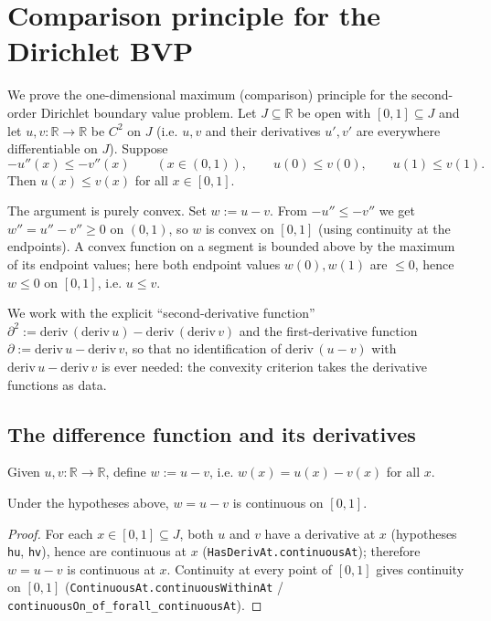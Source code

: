 


\section{Comparison principle for the Dirichlet BVP}

We prove the one-dimensional maximum (comparison) principle for the second-order
Dirichlet boundary value problem. Let $J \subseteq \mathbb{R}$ be open with
$[0,1] \subseteq J$ and let $u, v : \mathbb{R} \to \mathbb{R}$ be $C^2$ on $J$
(i.e. $u, v$ and their derivatives $u', v'$ are everywhere differentiable on $J$).
Suppose
\[
    -u''(x) \le -v''(x) \qquad (x \in (0,1)),
    \qquad u(0) \le v(0), \qquad u(1) \le v(1).
\]
Then $u(x) \le v(x)$ for all $x \in [0,1]$.

The argument is purely convex. Set $w := u - v$. From $-u'' \le -v''$ we get
$w'' = u'' - v'' \ge 0$ on $(0,1)$, so $w$ is convex on $[0,1]$ (using
continuity at the endpoints). A convex function on a segment is bounded above by
the maximum of its endpoint values; here both endpoint values $w(0), w(1)$ are
$\le 0$, hence $w \le 0$ on $[0,1]$, i.e. $u \le v$.

We work with the explicit ``second-derivative function'' $\partial^2 :=
\mathrm{deriv}\,(\mathrm{deriv}\,u) - \mathrm{deriv}\,(\mathrm{deriv}\,v)$ and the
first-derivative function $\partial := \mathrm{deriv}\,u - \mathrm{deriv}\,v$, so
that no identification of $\mathrm{deriv}\,(u-v)$ with $\mathrm{deriv}\,u -
\mathrm{deriv}\,v$ is ever needed: the convexity criterion takes the derivative
functions as data.

\subsection{The difference function and its derivatives}

\begin{definition}
    \label{def:w}
    \leanok
    Given $u, v : \mathbb{R} \to \mathbb{R}$, define $w := u - v$, i.e.
    $w(x) = u(x) - v(x)$ for all $x$.
\end{definition}

\begin{lemma}
    \label{lem:w-continuous}
    \leanok
    Under the hypotheses above, $w = u - v$ is continuous on $[0,1]$.
\end{lemma}
\begin{proof}
    For each $x \in [0,1] \subseteq J$, both $u$ and $v$ have a derivative at
    $x$ (hypotheses \texttt{hu}, \texttt{hv}), hence are continuous at $x$
    (\texttt{HasDerivAt.continuousAt}); therefore $w = u - v$ is continuous at
    $x$. Continuity at every point of $[0,1]$ gives continuity on $[0,1]$
    (\texttt{ContinuousAt.continuousWithinAt} / \texttt{continuousOn\_of\_forall\_continuousAt}).
\end{proof}

